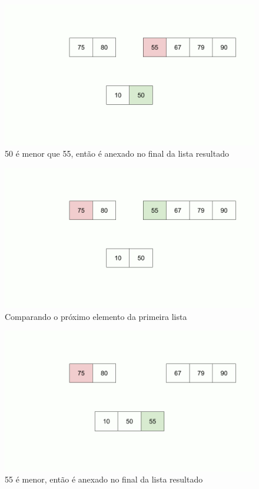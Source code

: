 \begin{figure}[!ht]
	\centering
	\includegraphics[scale=0.3]{figures/merge/merge-function-6.png}
	\caption{50 é menor que 55, então é anexado no final da lista resultado}
\end{figure}
\begin{figure}[!ht]
	\centering
	\includegraphics[scale=0.3]{figures/merge/merge-function-8.png}
	\caption{Comparando o próximo elemento da primeira lista}
\end{figure}
\begin{figure}[!ht]
	\centering
	\includegraphics[scale=0.3]{figures/merge/merge-function-9.png}
	\caption{55 é menor, então é anexado no final da lista resultado}
\end{figure}
